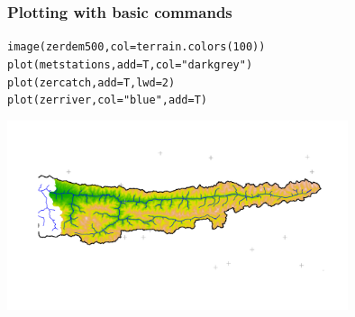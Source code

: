\documentclass[xcolor=table, xcolor=dvipsnames]{beamer}\usepackage[]{graphicx}\usepackage[]{color}
\makeatletter
\newcommand{\hlnum}[1]{\textcolor[rgb]{0,0,0}{#1}}
\newcommand{\hlstr}[1]{\textcolor[rgb]{0.545,0.137,0.137}{#1}}
\newcommand{\hlstd}[1]{\textcolor[rgb]{0,0,0}{#1}}
\newcommand{\hlkwc}[1]{\textcolor[rgb]{1,0,1}{#1}}
\newcommand{\hlkwd}[1]{\textcolor[rgb]{0,0,1}{#1}}
\newenvironment{kframe}{%
 \def\at@end@of@kframe{}%
 \ifinner\ifhmode%
  \def\at@end@of@kframe{\end{minipage}}%
  \begin{minipage}{\columnwidth}%
 \fi\fi%
 \def\FrameCommand##1{\hskip\@totalleftmargin \hskip-\fboxsep
 \colorbox{shadecolor}{##1}\hskip-\fboxsep
     \hskip-\linewidth \hskip-\@totalleftmargin \hskip\columnwidth}%
 \MakeFramed {\advance\hsize-\width
   \@totalleftmargin\z@ \linewidth\hsize
   \@setminipage}}%
 {\par\unskip\endMakeFramed%
 \at@end@of@kframe}
\newenvironment{knitrout}{}{} %
\makeatother
\begin{document}
\begin{frame}[fragile]\frametitle{Plotting with basic commands}
\begin{knitrout}
\color{fgcolor}\begin{kframe}
\begin{alltt}
\hlkwd{image}\hlstd{(zerdem500,} \hlkwc{col}\hlstd{=}\hlkwd{terrain.colors}\hlstd{(}\hlnum{100}\hlstd{))}
\hlkwd{plot}\hlstd{(metstations,} \hlkwc{add}\hlstd{=T,} \hlkwc{col}\hlstd{=}\hlstr{"darkgrey"}\hlstd{)}
\hlkwd{plot}\hlstd{(zercatch,} \hlkwc{add}\hlstd{=T,} \hlkwc{lwd}\hlstd{=}\hlnum{2}\hlstd{)}
\hlkwd{plot}\hlstd{(zerriver,} \hlkwc{col}\hlstd{=}\hlstr{"blue"}\hlstd{,} \hlkwc{add}\hlstd{=T)}
\end{alltt}
\end{kframe}
\end{knitrout}
\begin{center}
\includegraphics[width=0.75\textwidth]{./externalfig/basic_plotting.pdf}
\end{center}
\end{frame}



\end{document}

